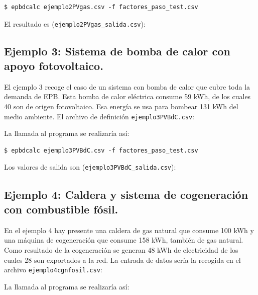 \documentclass[10pt,notitlepage,oneside,a4paper]{article}
\begin{document}
\begin{Verbatim}[fontsize=\small]
    $ epbdcalc ejemplo2PVgas.csv -f factores_paso_test.csv
\end{Verbatim}

El resultado es (\texttt{ejemplo2PVgas\_salida.csv}):


\subsection{Ejemplo 3: Sistema de bomba de calor con apoyo fotovoltaico.}
El ejemplo 3 recoge el caso de un sistema con bomba de calor que cubre toda la demanda de EPB. Esta bomba de calor eléctrica consume 59 kWh, de los cuales 40 son de origen fotovoltaico. Esa energía se usa para bombear 131 kWh del medio ambiente. El archivo de definición \texttt{ejemplo3PVBdC.csv}:


La llamada al programa se realizaría así:

\begin{Verbatim}[fontsize=\small]
    $ epbdcalc ejemplo3PVBdC.csv -f factores_paso_test.csv
\end{Verbatim}

Los valores de salida son (\texttt{ejemplo3PVBdC\_salida.csv}):


\subsection{Ejemplo 4: Caldera y sistema de cogeneración con combustible fósil.}
En el ejemplo 4 hay presente una caldera de gas natural que consume 100 kWh y una máquina de cogeneración que consume 158 kWh, también de gas natural. Como resultado de la cogeneración se generan 48 kWh de electricidad de los cuales 28 son exportados a la red. La entrada de datos sería la recogida en el archivo \texttt{ejemplo4cgnfosil.csv}:


La llamada al programa se realizaría así:
\end{document}
